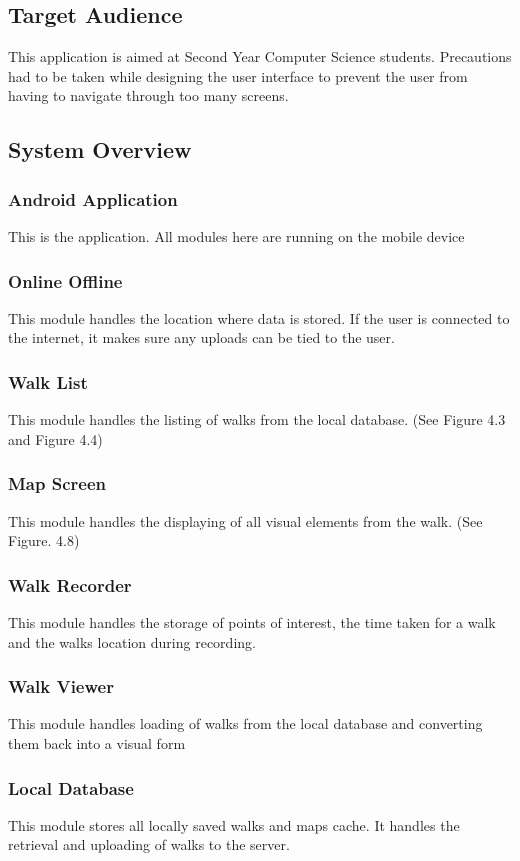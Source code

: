 \documentclass[12pt]{article}
\begin{document}
\subsection{Target Audience}
This application is aimed at Second Year Computer Science students. Precautions had to
be taken while designing the user interface to prevent the user from having to navigate
through too many screens.
\subsection{System Overview}

\subsubsection{Android Application}
This is the application. All modules here are running on the mobile device
\subsubsection{Online Offline}
This module handles the location where data is stored. If the user is connected to the
internet, it makes sure any uploads can be tied to the user.
\subsubsection{Walk List}
This module handles the listing of walks from the local database. (See Figure 4.3 and Figure 4.4)
\subsubsection{Map Screen}
This module handles the displaying of all visual elements from the walk. (See Figure. 4.8)
\subsubsection{Walk Recorder}
This module handles the storage of points of interest, the time taken for a walk and the walks location during recording.
\subsubsection{Walk Viewer}
This module handles loading of walks from the local database and converting them back into a visual form
\subsubsection{Local Database}
This module stores all locally saved walks and maps cache. It handles the retrieval and uploading of walks to the server.
\end{document}
